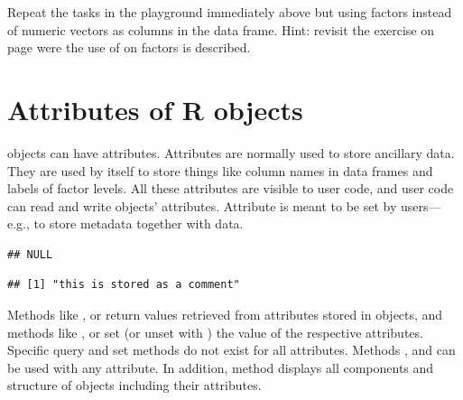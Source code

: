 \documentclass[krantz2]{krantz}\usepackage{knitr}
\begin{document}
\begin{advplayground}
Repeat the tasks in the playground immediately above but using factors instead of numeric vectors as columns in the data frame. Hint: revisit the exercise on page \pageref{calc:ADVPG:order:sort} were the use of  on factors is described.
\end{advplayground}




\section{Attributes of R objects}\label{sec:calc:attributes}

\Rlang objects can have attributes. Attributes are normally used to store ancillary data. They are used by \Rlang itself to store things like column names in data frames and labels of factor levels. All these attributes are visible to user code, and user code can read and write objects' attributes. Attribute  is meant to be set by users---e.g.,  to store metadata together with data.

\begin{knitrout}\footnotesize
{}\color{fgcolor}\begin{kframe}
\begin{alltt}
 \hlkwb{<-} \hlstd{(} \hlstd{=} \hlopt{:}\hlstd{,}  \hlstd{=} \hlstd{,}  \hlstd{=} \hlstd{(}\hlstd{,} \hlstd{))}
\end{alltt}
\begin{verbatim}
## NULL
\end{verbatim}
\begin{alltt}
 \hlkwb{<-} 
\end{alltt}
\begin{verbatim}
## [1] "this is stored as a comment"
\end{verbatim}
\end{kframe}
\end{knitrout}

Methods like ,  or  return values retrieved from attributes stored in \Rlang objects, and methods like ,  or  set (or unset with ) the value of the respective attributes. Specific query and set methods do not exist for all attributes. Methods ,  and  can be used with any attribute. In addition, method  displays all components and structure of \Rlang objects including their attributes.
\end{document}
